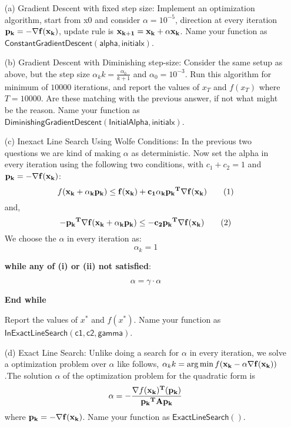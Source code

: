 \documentclass{article}
\begin{document}
\begin{enumerate}
    \item [(a)] Gradient Descent with fixed step size: Implement an optimization algorithm,
    start from x0 and consider $\alpha = 10^{-5}$, direction at every iteration $\bf{p_k = - \nabla f(x_k)}$, update rule is $\bf{x_{k + 1} = x_k + \alpha x_k}$. Name your function as $\mathsf{ConstantGradientDescent(alpha, initialx)}$.

    \item [(b)] Gradient Descent with Diminishing step-size: Consider the same setup as
    above, but the step size $\alpha_kk = \frac{\alpha_0}{k + 1}$ and $\alpha_0 = 10^{-3}$. Run this algorithm for minimum of $10000$ iterations, and report the values of $x_T$ and $f(x_T)$ where $T = 10000$. Are these matching with the previous answer, if not what might be the reason. Name your function as $\mathsf{DiminishingGradientDescent(InitialAlpha, initialx)}$.

    \item [(c)] Inexact Line Search Using Wolfe Conditions: In the previous two questions we are kind of making $\alpha$ as deterministic. Now set the alpha in every iteration using the following two conditions, with $c_1 + c_2 = 1$ and $\bf{p_k = - \nabla f(x_k)}$:
    \[f(\bf{x_k} + \alpha_k \bf{p_k}) \leq f(\bf{x_k}) + c_1\alpha_k \bf{p_k}^T \nabla f(\bf{x_k}) \tag{1}\]
    and,
    \[-\bf{p_k}^T \nabla f(\bf{x_k} + \alpha_k \bf{p_k}) \leq -c_2 \bf{p_k}^T \nabla f(\bf{x_k}) \tag{2}\]
    We choose the $\alpha$ in every iteration as: 
    $$\alpha_k = 1$$ 
    \begin{center}
        \textbf{while any of (i) or (ii) not satisfied}:
    \end{center}
    $$\alpha = \gamma \cdot \alpha$$
    \begin{center}
        \textbf{End while}
    \end{center}
    Report the values of $x^*$ and $f(x^*)$. Name your function as $\mathsf{InExactLineSearch(c1, c2, gamma)}$.

    \item [(d)] Exact Line Search: Unlike doing a search for $\alpha$ in every iteration, we solve a optimization problem over $\alpha$ like follows, $\alpha_kk = \arg\min f(\bf{x_k} - \alpha \nabla f(\bf{x_k}))$.The solution $\alpha$ of the optimization problem for the quadratic form is
    \[
        \alpha = -\frac{\nabla f(\bf{x_k})^T (\bf{p_k})}{\bf{p_k}^T \bf{A} \bf{p_k}}
    \]
    where $\bf{p_k} = - \nabla f(\bf{x_k})$. Name your function as $\mathsf{ExactLineSearch()}$.
\end{enumerate}
\end{document}
